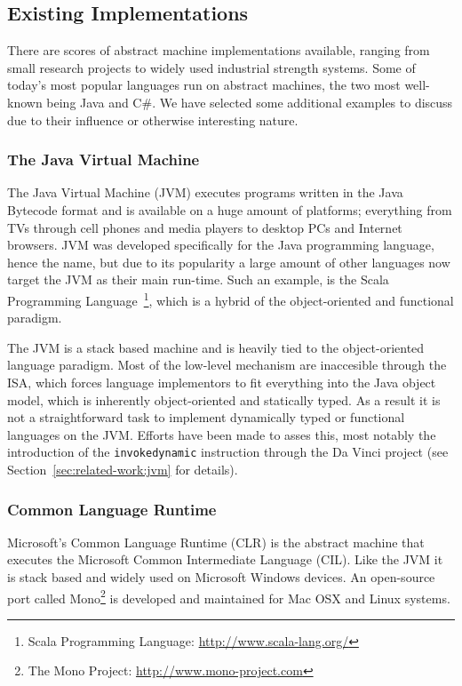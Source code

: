 \subsection{Existing Implementations}

There are scores of abstract machine implementations available, ranging from
small research projects to widely used industrial strength systems. Some of
today's most popular languages run on abstract machines, the two most well-known
being Java and C\#\cite{langpop}. We have selected some additional examples to
discuss due to their influence or otherwise interesting nature.

\subsubsection{The Java Virtual Machine}

The Java Virtual Machine (JVM) executes programs written in the Java Bytecode
format and is available on a huge amount of platforms; everything from TVs
through cell phones and media players to desktop PCs and Internet
browsers\cite{aboutjava}. JVM was developed specifically for the Java
programming language, hence the name, but due to its popularity a large amount
of other languages now target the JVM as their main run-time. Such an example,
is the Scala Programming Language~\footnote{Scala Programming Language:
  \url{http://www.scala-lang.org/}}, which is a hybrid of the object-oriented
and functional paradigm.

The JVM is a stack based machine and is heavily tied to the object-oriented
language paradigm. Most of the low-level mechanism are inaccesible through the
ISA, which forces language implementors to fit everything into the Java object
model, which is inherently object-oriented and statically typed. As a result it
is not a straightforward task to implement dynamically typed or functional
languages on the JVM. Efforts have been made to asses this, most notably the
introduction of the \texttt{invokedynamic} instruction through the Da Vinci
project (see Section~\ref{sec:related-work:jvm} for details).

\subsubsection{Common Language Runtime}

Microsoft's Common Language Runtime (CLR) is the abstract machine that executes
the Microsoft Common Intermediate Language (CIL). Like the JVM it is stack based
and widely used on Microsoft Windows devices. An open-source port called
Mono\footnote{The Mono Project: \url{http://www.mono-project.com}} is developed
and maintained for Mac OSX and Linux systems.


